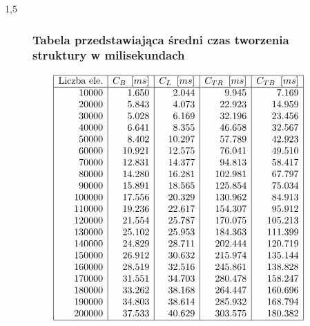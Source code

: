 \documentclass[polish,polish,a4paper]{article}
\begin{document}
\begin{spacing}{1,5}
\begin{figure}[H]
		\subsubsection*{Tabela przedstawiająca średni czas tworzenia struktury w milisekundach}
		\centering
		\begin{equation*}
		\begin{array}{|r|r|r|r|r|}
		\hline
		\multicolumn{1}{|c|}{$Liczba ele.$}&\multicolumn{1}{c|}{C_{B}\enskip[ms]}&\multicolumn{1}{c|}{C_{L}\enskip[ms]}&\multicolumn{1}{c|}{C_{TR}\enskip[ms]}&\multicolumn{1}{c|}{C_{TB}\enskip[ms]}\\ \hline
		10000&1.650&2.044&9.945&7.169\\
		20000&5.843&4.073&22.923&14.959\\
		30000&5.028&6.169&32.196&23.456\\
		40000&6.641&8.355&46.658&32.567\\
		50000&8.402&10.297&57.789&42.923\\
		60000&10.921&12.575&76.041&49.510\\
		70000&12.831&14.377&94.813&58.417\\
		80000&14.280&16.281&102.981&67.797\\
		90000&15.891&18.565&125.854&75.034\\
		100000&17.556&20.329&130.962&84.913\\
		110000&19.236&22.617&154.307&95.912\\
		120000&21.554&25.787&170.075&105.213\\
		130000&25.102&25.953&184.363&111.399\\
		140000&24.829&28.711&202.444&120.719\\
		150000&26.912&30.632&215.974&135.144\\
		160000&28.519&32.516&245.861&138.828\\
		170000&31.551&34.703&280.478&158.247\\
		180000&33.262&38.168&264.447&160.696\\
		190000&34.803&38.614&285.932&168.794\\
		200000&37.533&40.629&303.575&180.382\\\hline		
		\end{array}
		\end{equation*}
\end{figure}
\end{spacing}
\end{document}
